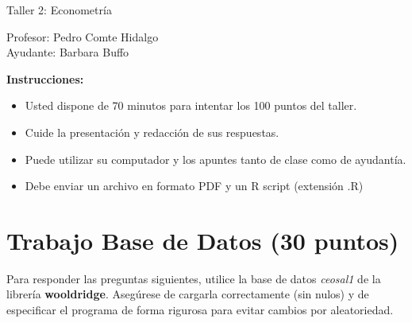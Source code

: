 \documentclass[letterpaper,11pt]{article}
\begin{document}
\begin{center}
    {\Large  Taller 2: Econometría }

Profesor:    Pedro Comte Hidalgo\\
Ayudante:     Barbara Buffo
\end{center}

\textbf{Instrucciones:} 

\begin{itemize}
    \item Usted dispone de 70 minutos  para intentar los 100 puntos del taller.
    \item Cuide la presentación y redacción de sus respuestas.
    \item Puede utilizar su computador y los apuntes tanto de clase como de ayudantía.
    \item Debe enviar un archivo en formato PDF y un R script (extensión .R)
\end{itemize}

\section{Trabajo Base de Datos (30 puntos)}

Para responder las preguntas siguientes, utilice la base de datos \textit{ceosal1} de la librería \textbf{wooldridge}. Asegúrese de cargarla correctamente (sin nulos) y de especificar el programa de forma rigurosa para evitar cambios por aleatoriedad.
\end{document}
